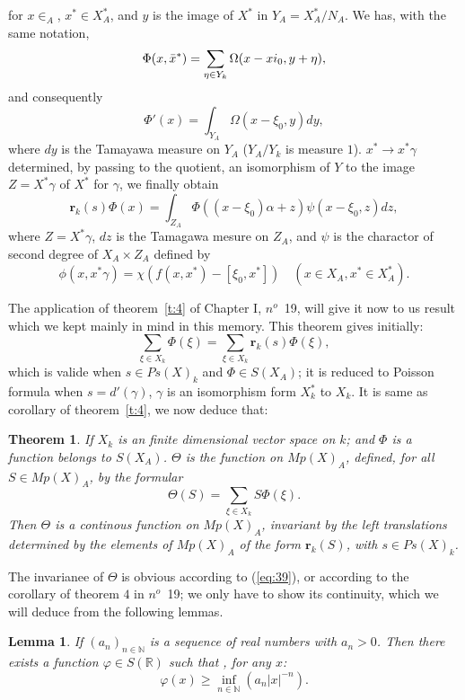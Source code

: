 \documentclass[12pt]{amsart}
\newtheorem{lemma}{Lemma}
\newtheorem{thm}{Theorem}
\def\bR{{\mathbb{R}}}
\def\bN{{\mathbb{N}}}
\def\br{{\mathbf{r}}}
\newcounter{ssection}
\renewcommand{\subsection}{
  \addtocounter{ssection}{1}{\bf  \arabic{ssection}.\  }}
\begin{document}
for $x\in _A$, $x^*\in X_A^*$, and $y$ is the image of $X^*$ in $Y_A=X^*_A/N_A$.
We has, with the same notation,
\[
\Phi(x,{\bar{x}}^*)=\sum_{\eta\in Y_k}\Omega(x-xi_0,y+\eta),
\]
and consequently
\[
\Phi'(x) = \int_{Y_A}\Omega(x-\xi_0,y)dy,
\]
where $dy$ is the Tamayawa measure on $Y_A$ ($Y_A/Y_k$ is measure $1$).
$x^*\to x^*\gamma$ determined, by passing to the quotient, an isomorphism of
$Y$ to the image $Z=X^*\gamma$ of $X^*$ for $\gamma$, we finally obtain
\[
\br_k(s)\Phi(x) = \int_{Z_A}\Phi((x-\xi_0)\alpha+ z)\psi(x-\xi_0, z) dz,
\]
where $Z=X^*\gamma$, $dz$ is the Tamagawa mesure on $Z_A$, and $\psi$ is 
the charactor of second degree of $X_A\times Z_A$ defined by 
\[
\phi(x,x^*\gamma) = \chi(f(x,x^*)-[\xi_0,x^*])
\quad (x\in X_A,x^*\in X^*_A).
\]

\subsection{}
The application of theorem~\ref{t:4} of Chapter I, $n^o$~19, 
will give it now to us 
result which we kept mainly in mind in this memory.  
This theorem gives initially: 
\begin{equation}\label{eq:39}
\sum_{\xi\in X_k} \Phi(\xi)= \sum_{\xi\in X_k}\br_k(s)\Phi(\xi),
\end{equation}
which is valide when $s\in Ps(X)_k$ and $\Phi \in S(X_A)$;
it is reduced to Poisson formula when $s =d'(\gamma)$, $\gamma$ is an
isomorphism form $X^*_k$ to $X_k$. 
It is same as corollary of theorem~\ref{t:4}, we now deduce that:
\begin{thm}\label{t:6}
If $X_k$ is an finite dimensional vector space on $k$; and $\Phi$ is 
a function belongs to $S(X_A)$. $\Theta$ is the function on $Mp(X)_A$, defined,
for all $S\in Mp(X)_A$, by the formular
\[
\Theta(S) = \sum_{\xi\in X_k} S\Phi(\xi).
\]
Then $\Theta$ is a continous function on $Mp(X)_A$, 
invariant by the left translations determined by 
the elements of $Mp(X)_A$ of the form $\br_k(S)$, 
with $s\in Ps(X)_k$.
\end{thm} 

The invarianee of $\Theta$ is obvious according to (\ref{eq:39}),
or according to the corollary of theorem $4$ in $n^o$~19; 
we only have to show its continuity,
which we will deduce from the following lemmas. 

\begin{lemma}\label{l:4}
If $(a_n)_{n\in \bN}$ is a sequence of real numbers with $a_n>0$. 
Then there exists a function $\varphi\in S(\bR)$ such that , for any $x$:
\[
\varphi(x) \geq \inf_{n\in \bN} (a_n|x|^{-n}).
\]
\end{lemma}
\end{document}
